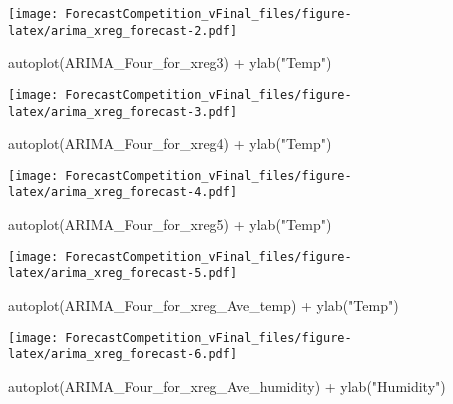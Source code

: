 \documentclass[
]{article}
\newenvironment{Shaded}{\begin{snugshade}}{\end{snugshade}}
\newcommand{\FunctionTok}[1]{\textcolor[rgb]{0.00,0.00,0.00}{#1}}
\newcommand{\NormalTok}[1]{#1}
\newcommand{\SpecialCharTok}[1]{\textcolor[rgb]{0.00,0.00,0.00}{#1}}
\newcommand{\StringTok}[1]{\textcolor[rgb]{0.31,0.60,0.02}{#1}}
\begin{document}
\texttt{[image: ForecastCompetition\_vFinal\_files/figure-latex/arima\_xreg\_forecast-2.pdf]}

\begin{Shaded}
\begin{Highlighting}[]
\FunctionTok{autoplot}\NormalTok{(ARIMA\_Four\_for\_xreg3) }\SpecialCharTok{+} \FunctionTok{ylab}\NormalTok{(}\StringTok{"Temp"}\NormalTok{)}
\end{Highlighting}
\end{Shaded}

\texttt{[image: ForecastCompetition\_vFinal\_files/figure-latex/arima\_xreg\_forecast-3.pdf]}

\begin{Shaded}
\begin{Highlighting}[]
\FunctionTok{autoplot}\NormalTok{(ARIMA\_Four\_for\_xreg4) }\SpecialCharTok{+} \FunctionTok{ylab}\NormalTok{(}\StringTok{"Temp"}\NormalTok{)}
\end{Highlighting}
\end{Shaded}

\texttt{[image: ForecastCompetition\_vFinal\_files/figure-latex/arima\_xreg\_forecast-4.pdf]}

\begin{Shaded}
\begin{Highlighting}[]
\FunctionTok{autoplot}\NormalTok{(ARIMA\_Four\_for\_xreg5) }\SpecialCharTok{+} \FunctionTok{ylab}\NormalTok{(}\StringTok{"Temp"}\NormalTok{)}
\end{Highlighting}
\end{Shaded}

\texttt{[image: ForecastCompetition\_vFinal\_files/figure-latex/arima\_xreg\_forecast-5.pdf]}

\begin{Shaded}
\begin{Highlighting}[]
\FunctionTok{autoplot}\NormalTok{(ARIMA\_Four\_for\_xreg\_Ave\_temp) }\SpecialCharTok{+} \FunctionTok{ylab}\NormalTok{(}\StringTok{"Temp"}\NormalTok{)}
\end{Highlighting}
\end{Shaded}

\texttt{[image: ForecastCompetition\_vFinal\_files/figure-latex/arima\_xreg\_forecast-6.pdf]}

\begin{Shaded}
\begin{Highlighting}[]
\FunctionTok{autoplot}\NormalTok{(ARIMA\_Four\_for\_xreg\_Ave\_humidity) }\SpecialCharTok{+} \FunctionTok{ylab}\NormalTok{(}\StringTok{"Humidity"}\NormalTok{)}
\end{Highlighting}
\end{Shaded}
\end{document}
